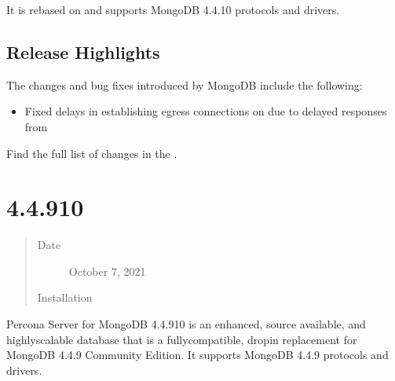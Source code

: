 \documentclass[letterpaper,10pt,english]{sphinxmanual}
\begin{document}
\sphinxAtStartPar
It is rebased on  and supports MongoDB 4.4.10 protocols and drivers.


\subsection{Release Highlights}
\label{\detokenize{release_notes/4.4.10-11:release-highlights}}
\sphinxAtStartPar
The changes and bug fixes introduced by MongoDB include the following:
\begin{itemize}
\item {} 
\sphinxAtStartPar
Fixed delays in establishing egress connections on  due to delayed responses from 

\end{itemize}

\sphinxAtStartPar
Find the full list of changes in the .


\section{ 4.4.9\sphinxhyphen{}10}
\label{\detokenize{release_notes/4.4.9-10:percona-server-for-mongodb-4-4-9-10}}\label{\detokenize{release_notes/4.4.9-10:psmdb-4-4-9-10}}\label{\detokenize{release_notes/4.4.9-10::doc}}\begin{quote}\begin{description}
\item[{Date}] \leavevmode
\sphinxAtStartPar
October 7, 2021

\item[{Installation}] \leavevmode
\sphinxAtStartPar
{}

\end{description}\end{quote}

\sphinxAtStartPar
Percona Server for MongoDB 4.4.9\sphinxhyphen{}10 is an enhanced, source available, and highly\sphinxhyphen{}scalable database that is a
fully\sphinxhyphen{}compatible, drop\sphinxhyphen{}in replacement for MongoDB 4.4.9 Community Edition.
It supports MongoDB 4.4.9 protocols and drivers.
\end{document}
